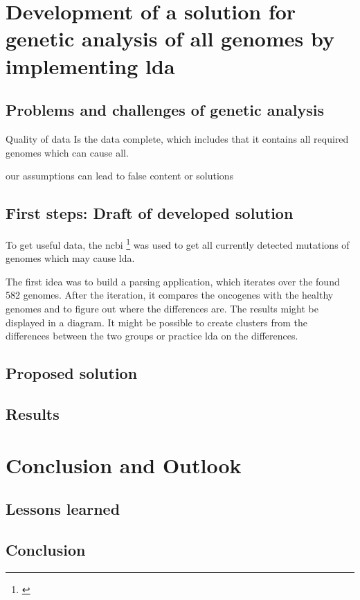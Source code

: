 {{{{\chapter{Development of a solution for genetic analysis of \gls{all} genomes by implementing \gls{lda}}\label{development}
\section{Problems and challenges of genetic analysis}\label{problems_challenges}
Quality of data 
Is the data complete, which includes that it contains all required genomes which can cause \gls{all}.

our assumptions can lead to false content or solutions 

\section{First steps: Draft of developed solution}\label{draft}

To get useful data, the \gls{ncbi} \footnote{\autocite{ncbi}} was used to get all currently detected mutations of genomes which may cause \gls{lda}.

The first idea was to build a parsing application, which iterates over the found 582 genomes. After the iteration, it compares the oncogenes with the healthy genomes and to figure out where the differences are. The results might be displayed in a diagram. It might be possible to create clusters from the differences between the two groups or practice \gls{lda} on the differences.

\section{Proposed solution}\label{proposed_solution}
\section{Results}\label{results}


\chapter{Conclusion and Outlook}\label{conclusion_outlook}
\section{Lessons learned}\label{lessons_learned}
\section{Conclusion}\label{conclusion}
}}}}

